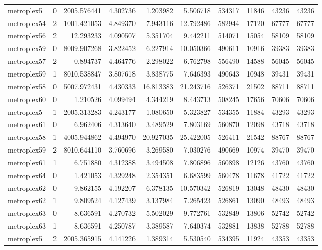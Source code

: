 \begin{longtable}{|l|r|r|r|r|r|r|r|r|r|}
metroplex5 & 0 & 2005.576441 & 4.302736 & 1.203982 & 5.506718 & 534317 & 11846 & 43236 & 43236 \\
metroplex54 & 2 & 1001.421053 & 4.849370 & 7.943116 & 12.792486 & 582944 & 17120 & 67777 & 67777 \\
metroplex56 & 2 & 12.293233 & 4.090507 & 5.351704 & 9.442211 & 514071 & 15054 & 58109 & 58109 \\
metroplex59 & 0 & 8009.907268 & 3.822452 & 6.227914 & 10.050366 & 490611 & 10916 & 39383 & 39383 \\
metroplex57 & 2 & 0.894737 & 4.464776 & 2.298022 & 6.762798 & 556490 & 14588 & 56045 & 56045 \\
metroplex59 & 1 & 8010.538847 & 3.807618 & 3.838775 & 7.646393 & 490643 & 10948 & 39431 & 39431 \\
metroplex58 & 0 & 5007.972431 & 4.430333 & 16.813383 & 21.243716 & 526371 & 21502 & 88711 & 88711 \\
metroplex60 & 0 & 1.210526 & 4.099494 & 4.344219 & 8.443713 & 508245 & 17656 & 70606 & 70606 \\
metroplex5 & 1 & 2005.313283 & 4.243177 & 1.080650 & 5.323827 & 534355 & 11884 & 43293 & 43293 \\
metroplex61 & 0 & 6.962406 & 4.313640 & 3.489529 & 7.803169 & 560870 & 12098 & 43718 & 43718 \\
metroplex58 & 1 & 4005.944862 & 4.494970 & 20.927035 & 25.422005 & 526411 & 21542 & 88767 & 88767 \\
metroplex59 & 2 & 8010.644110 & 3.760696 & 3.269580 & 7.030276 & 490669 & 10974 & 39470 & 39470 \\
metroplex61 & 1 & 6.751880 & 4.312388 & 3.494508 & 7.806896 & 560898 & 12126 & 43760 & 43760 \\
metroplex64 & 0 & 1.421053 & 4.329248 & 2.354351 & 6.683599 & 560478 & 11678 & 41722 & 41722 \\
metroplex62 & 0 & 9.862155 & 4.192207 & 6.378135 & 10.570342 & 526819 & 13048 & 48430 & 48430 \\
metroplex62 & 1 & 9.809524 & 4.127439 & 3.137984 & 7.265423 & 526861 & 13090 & 48493 & 48493 \\
metroplex63 & 0 & 8.636591 & 4.270732 & 5.502029 & 9.772761 & 532849 & 13806 & 52742 & 52742 \\
metroplex63 & 1 & 8.636591 & 4.250787 & 3.389587 & 7.640374 & 532881 & 13838 & 52788 & 52788 \\
metroplex5 & 2 & 2005.365915 & 4.141226 & 1.389314 & 5.530540 & 534395 & 11924 & 43353 & 43353 \\

\end{longtable}
